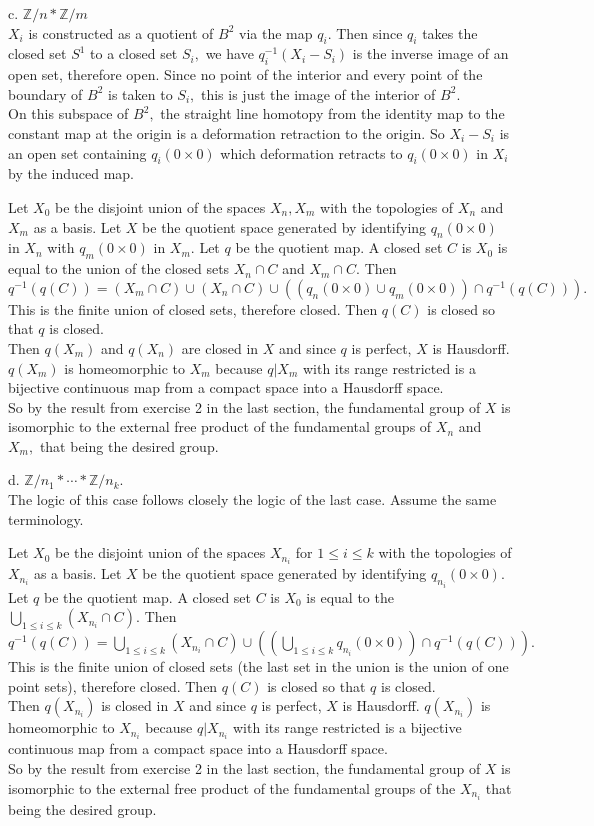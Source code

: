 \documentclass{article}
\begin{document}
c. $\mathbb{Z}/n *\mathbb{Z}/m$
\\
$X_i$ is constructed as a quotient of $B^2$ via the map $q_i.$  Then since $q_i$ takes the closed set $S^1$ to a closed set $S_i,$ we have $q_i^{-1}(X_i-S_i)$ is the inverse image of an open set, therefore open.  Since no point of the interior and every point of the boundary of $B^2$ is taken to $S_i,$ this is just the image of the interior of $B^2.$
\\
On this subspace of $B^2,$ the straight line homotopy from the identity map to the constant map at the origin is a deformation retraction to the origin. So $X_i-S_i$ is an open set containing $q_i(0\times 0)$ which deformation retracts to $q_i(0\times 0)$ in $X_i$ by the induced map.

Let $X_0$ be the disjoint union of the spaces $X_n,X_m$ with the topologies of $X_n$ and $X_m$ as a basis.  Let $X$ be the quotient space generated by identifying $q_n(0\times 0)$ in $X_n$ with $q_m(0\times 0)$ in $X_m.$  Let $q$ be the quotient map.  A closed set $C$ is $X_0$ is equal to the union of the closed sets $X_n\cap C$ and $X_m\cap C.$  Then $q^{-1}(q(C))=(X_m\cap C)\cup (X_n\cap C)\cup((q_n(0\times0)\cup q_m(0\times 0))\cap q^{-1}(q(C))).$  This is the finite union of closed sets, therefore closed.  Then $q(C)$ is closed so that $q$ is closed.
\\
Then $q(X_m)$ and $q(X_n)$ are closed in $X$ and since $q$ is perfect, $X$ is Hausdorff.  $q(X_m)$ is homeomorphic to $X_m$ because $q|X_m$ with its range restricted is a bijective continuous map from a compact space into a Hausdorff space.
\\
So by the result from exercise 2 in the last section, the fundamental group of $X$ is isomorphic to the external free product of the fundamental groups of $X_n$ and $X_m,$ that being the desired group.

d. $\mathbb{Z}/n_1 *\cdots*\mathbb{Z}/n_k.$
\\The logic of this case follows closely the logic of the last case.  Assume the same terminology.

Let $X_0$ be the disjoint union of the spaces $X_{n_i}$ for $1\le i\le k$ with the topologies of $X_{n_i}$ as a basis.  Let $X$ be the quotient space generated by identifying $q_{n_i}(0\times 0).$  Let $q$ be the quotient map.  A closed set $C$ is $X_0$ is equal to the $\bigcup_{1\le i\le k}(X_{n_i}\cap C).$  Then $q^{-1}(q(C))=\bigcup_{1\le i\le k}(X_{n_i}\cap C)\cup ((\bigcup_{1\le i\le k}q_{n_i}(0\times 0))\cap q^{-1}(q(C))).$  This is the finite union of closed sets (the last set in the union is the union of one point sets), therefore closed.  Then $q(C)$ is closed so that $q$ is closed.
\\
Then $q(X_{n_i})$ is closed in $X$ and since $q$ is perfect, $X$ is Hausdorff.  $q(X_{n_i})$ is homeomorphic to $X_{n_i}$ because $q|X_{n_i}$ with its range restricted is a bijective continuous map from a compact space into a Hausdorff space.
\\
So by the result from exercise 2 in the last section, the fundamental group of $X$ is isomorphic to the external free product of the fundamental groups of the $X_{n_i}$ that being the desired group.
\end{document}
